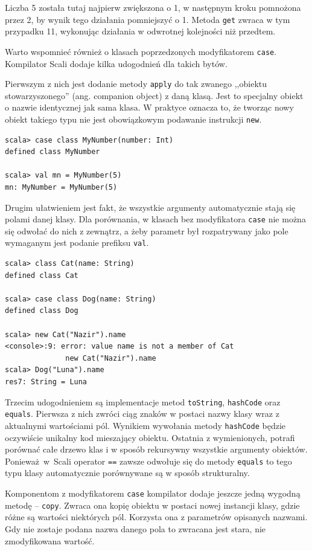 \documentclass[wimgr]{xmgr}
\begin{document}
Liczba 5 została tutaj najpierw zwiększona o 1, w następnym kroku pomnożona przez 2, by wynik tego działania pomniejszyć o 1. Metoda \texttt{get} zwraca w tym przypadku 11, wykonując działania w odwrotnej kolejności niż przedtem.

Warto wspomnieć również o klasach poprzedzonych modyfikatorem \texttt{case}. Kompilator Scali dodaje kilka udogodnień dla takich bytów. 

Pierwszym z nich jest dodanie metody \texttt{apply} do tak zwanego ,,obiektu stowarzyszonego'' (ang. companion object) z daną klasą. Jest to specjalny obiekt o nazwie identycznej jak sama klasa. W praktyce oznacza to, że tworząc nowy obiekt takiego typu nie jest obowiązkowym podawanie instrukcji \texttt{new}. 

\begin{verbatim}
scala> case class MyNumber(number: Int)
defined class MyNumber

scala> val mn = MyNumber(5)
mn: MyNumber = MyNumber(5)
\end{verbatim}

Drugim ułatwieniem jest fakt, że wszystkie argumenty automatycznie stają się polami danej klasy. Dla porównania, w klasach bez modyfikatora \texttt{case} nie można się odwołać do nich z zewnątrz, a żeby parametr był rozpatrywany jako pole wymaganym jest podanie prefiksu \texttt{val}.

\begin{verbatim}
scala> class Cat(name: String)
defined class Cat

scala> case class Dog(name: String)
defined class Dog

scala> new Cat("Nazir").name
<console>:9: error: value name is not a member of Cat
              new Cat("Nazir").name
scala> Dog("Luna").name
res7: String = Luna           
\end{verbatim}

Trzecim udogodnieniem są implementacje metod \texttt{toString}, \texttt{hashCode} oraz \texttt{equals}. Pierwsza z nich zwróci ciąg znaków w postaci nazwy klasy wraz z aktualnymi wartościami pól. Wynikiem wywołania metody \texttt{hashCode} będzie oczywiście unikalny kod mieszający obiektu. Ostatnia z wymienionych, potrafi porównać całe drzewo klas i w sposób rekursywny wszystkie argumenty obiektów. Ponieważ~w~Scali operator \texttt{==} zawsze odwołuje się do metody \texttt{equals} to tego typu klasy automatycznie porównywane są w sposób strukturalny.    

Komponentom z modyfikatorem \texttt{case} kompilator dodaje jeszcze jedną wygodną metodę -- \texttt{copy}. Zwraca ona kopię obiektu w postaci nowej instancji klasy, gdzie różne są wartości niektórych pól. Korzysta ona z parametrów opisanych nazwami. Gdy nie zostaje podana nazwa danego pola to zwracana jest stara, nie zmodyfikowana wartość. 
\end{document}
